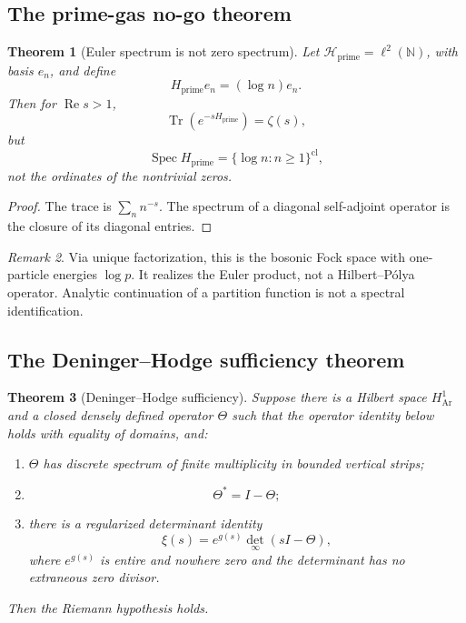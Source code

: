 \documentclass[11pt]{article}
\newtheorem{theorem}{Theorem}[section]
\theoremstyle{definition}
\theoremstyle{remark}
\newtheorem{remark}[theorem]{Remark}
\DeclareMathOperator{\Spec}{Spec}
\DeclareMathOperator{\Tr}{Tr}
\newcommand{\HH}{\mathcal H}
\newcommand{\1}{\mathbf 1}
\begin{document}
\subsection{The prime-gas no-go theorem}

\begin{theorem}[Euler spectrum is not zero spectrum]
Let $\HH_{\mathrm{prime}}=\ell^2(\mathbb N)$, with basis $e_n$, and define
\[
H_{\mathrm{prime}}e_n=(\log n)e_n.
\]
Then for $\operatorname{Re}s>1$,
\[
\Tr(e^{-sH_{\mathrm{prime}}})=\zeta(s),
\]
but
\[
\Spec H_{\mathrm{prime}}=\{\log n:n\geq1\}^{\mathrm{cl}},
\]
not the ordinates of the nontrivial zeros.
\end{theorem}

\begin{proof}
The trace is $\sum_nn^{-s}$.  The spectrum of a diagonal self-adjoint operator is the closure of its diagonal entries.
\end{proof}

\begin{remark}
Via unique factorization, this is the bosonic Fock space with one-particle energies $\log p$.  It realizes the Euler product, not a Hilbert--P\'olya operator.  Analytic continuation of a partition function is not a spectral identification.
\end{remark}

\subsection{The Deninger--Hodge sufficiency theorem}

\begin{theorem}[Deninger--Hodge sufficiency]
Suppose there is a Hilbert space $H^1_{\mathrm{Ar}}$ and a closed densely defined operator $\Theta$ such that the operator identity below holds with equality of domains, and:
\begin{enumerate}[label=(D\arabic*)]
\item $\Theta$ has discrete spectrum of finite multiplicity in bounded vertical strips;
\item
\[
\Theta^*=I-\Theta;
\tag{6.2}
\]
\item there is a regularized determinant identity
\[
\xi(s)=e^{g(s)}\det_{\infty}(sI-\Theta),
\tag{6.3}
\]
where $e^{g(s)}$ is entire and nowhere zero and the determinant has no extraneous zero divisor.
\end{enumerate}
Then the Riemann hypothesis holds.
\end{theorem}
\end{document}
